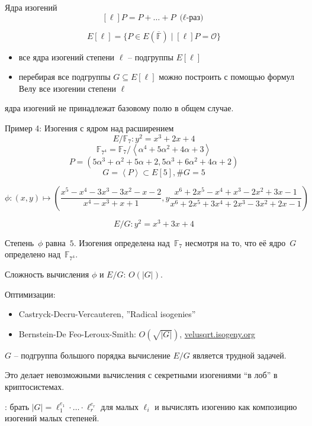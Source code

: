 \documentclass{beamer}
\begin{document}
\begin{frame}{Ядра изогений}
	\[
	[\ell] P = P + \ldots + P~\text{($\ell$-раз)}
	\]
	
	\[
	E[\ell] = \{ P \in E(\overline{\mathbb{F}}) \mid [\ell] P = \mathcal{O} \}
	\]
	
	\begin{itemize}
		\item все ядра изогений степени $\ell$ -- подгруппы $E[\ell]$
		\item перебирая все подгруппы $G  \subseteq E[\ell]$ можно построить с помощью формул Велу все изогении степени $\ell$
	\end{itemize}
	
	\vspace{1em}
	 ядра изогений не принадлежат базовому полю в общем случае.
\end{frame}

\begin{frame}{Пример 4: Изогения с ядром над расширением}
	\[E/\mathbb{F}_{7}: y^2 = x^3 + 2 x + 4\]
	\[\mathbb{F}_{7^4} = \mathbb{F}_7 / \left< \alpha^4 + 5 \alpha^2 + 4 \alpha + 3 \right>\]
	\[P  = (5\alpha^3 + \alpha^2 + 5 \alpha + 2, 5 \alpha^3 + 6 \alpha^2 + 4 \alpha + 2)\]
	\[
	G = \left< P \right> \subset E[5],
	\#G = 5
	\]
	
	\begin{footnotesize}
	\[\phi: (x,y) \mapsto \left(\frac{x^5 - x^4 - 3 x^3 - 3 x^2 - x - 2}{x^4 - x^3 + x + 1}, y \frac{x^6 + 2 x^5 - x^4 + x^3 - 2 x^2 + 3 x - 1}{x^6 + 2 x^5 + 3 x^4 + 2 x^3 - 3 x^2 + 2 x - 1}\right)\]
	\end{footnotesize}

	
	\[E/G: y^2 = x^3 + 3 x + 4 \]
	\begin{center}
		Степень~$\phi$ равна~$5$. Изогения определена над~$\mathbb{F}_7$ несмотря на то, что её ядро~$G$ определено над~$\mathbb{F}_{7^4}$.
	\end{center}
\end{frame}

\begin{frame}
    Сложность вычисления $\phi$ и $E/G$: $O(|G|)$.

	\vspace{1em}
	Оптимизации:
	\begin{itemize}
		\item Castryck-Decru-Vercauteren, ''Radical isogenies''
		\item Bernstein-De Feo-Leroux-Smith: $O(\sqrt{|G|})$, \url{velusqrt.isogeny.org}
	\end{itemize}
	\vspace{1em}
	
	$G$ -- подгруппа большого порядка \structure{$\implies$} вычисление $E/G$ является трудной задачей.
	
	\vspace{1em}
	Это делает невозможными вычисления с секретными изогениями ``в лоб'' в криптосистемах.
	
	\vspace{1em} 
	: брать $|G| = \ell_1^{e_1} \cdot \ldots \cdot \ell_r^{e_r}$ для малых $\ell_i$ и вычислять изогению как композицию изогений малых степеней.
\end{frame}
\end{document}
